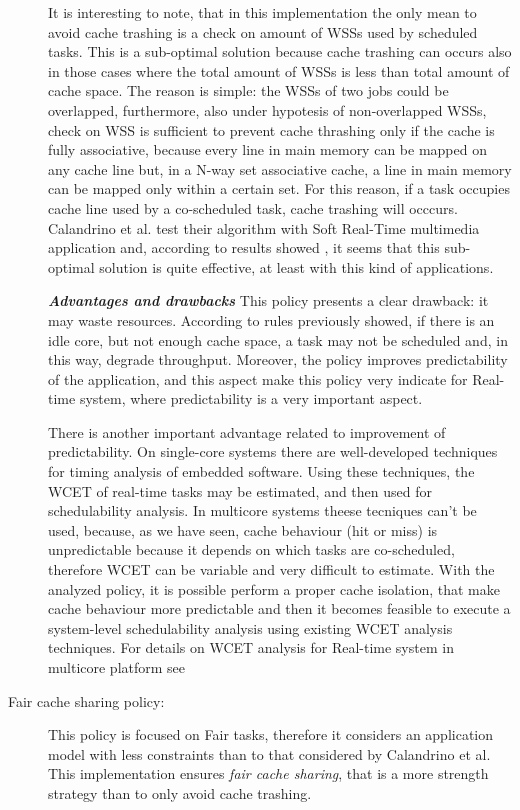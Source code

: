 \begin{description}
It is interesting to note, that in this implementation the only mean to avoid cache trashing is a check on amount of WSSs used by scheduled tasks.
This is a sub-optimal solution because cache trashing can occurs also in those cases where the total amount of WSSs is less than total amount of cache
space. The reason is simple: the WSSs of two jobs could be overlapped, furthermore, also under hypotesis of non-overlapped WSSs, check on WSS is sufficient
to prevent cache thrashing only if the cache is fully associative, because every line in main memory can be mapped on any cache line but, in a N-way 
set associative cache, a line in main memory can be mapped only within a certain set. For this reason, if a task occupies cache line used by a co-scheduled 
task, cache trashing will occcurs. Calandrino et al. test their algorithm with Soft Real-Time multimedia application and, according to results showed 
\cite{calandro}, it seems that this sub-optimal solution is quite effective, at least with this kind of applications.

\textbf{\textit{Advantages and drawbacks}} This policy presents a clear drawback: it may waste resources. According to rules previously showed, if there 
is an idle core, but not enough cache space, a task may not be scheduled and, in this way, degrade throughput. Moreover, the policy improves predictability 
of the application, and this aspect make this policy very indicate for Real-time system, where predictability is a very important aspect.

There is another important advantage related to improvement of predictability. On single-core systems there are well-developed techniques for timing 
analysis of embedded software. Using these techniques, the WCET of real-time tasks may be estimated, and then used for schedulability analysis. 
In multicore systems theese tecniques can't be used, because, as we have seen, cache behaviour (hit or miss) is unpredictable because it depends on which 
tasks are co-scheduled, therefore WCET can be variable and very difficult to estimate. With the analyzed policy, it is possible perform a proper cache 
isolation, that make cache behaviour more predictable and then it becomes feasible to execute a system-level schedulability analysis using existing WCET 
analysis techniques. For details on WCET analysis for Real-time system in multicore platform see \cite{guann}


\item[Fair cache sharing policy:]

This policy is focused on Fair tasks, therefore it considers an application model with less constraints than to that considered by
Calandrino et al. This implementation ensures \textit{fair cache sharing}, that is a more strength strategy than to only avoid cache trashing.


\end{description}

